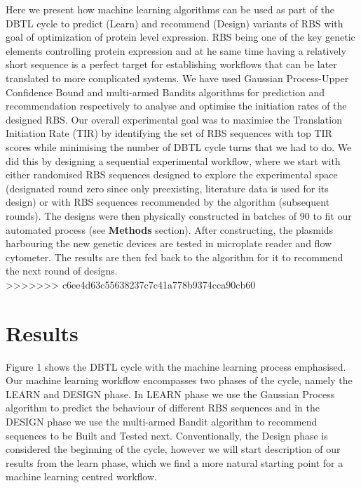 \documentclass{article}
\begin{document}
Here we present how machine learning algorithms can be used as part of the DBTL cycle to predict (Learn) and recommend (Design) variants of RBS with goal of optimization of protein level expression. RBS being one of the key genetic elements controlling protein expression and at he same time having a relatively short sequence is a perfect target for establishing workflows that can be later translated to more complicated systems.
We have used Gaussian Process-Upper Confidence Bound and multi-armed Bandits algorithms for prediction and recommendation respectively to analyse and optimise the initiation rates of the designed RBS. 
Our overall experimental goal was to maximise the Translation Initiation Rate (TIR) by identifying the set of RBS sequences with top TIR scores while minimising the number of DBTL cycle turns that we had to do.
We did this by designing a sequential experimental workflow, where we start with either randomised RBS sequences designed to explore the experimental space (designated round zero since only preexisting, literature data is used for its design) or with RBS sequences recommended by the algorithm (subsequent rounds). The designs were then physically constructed in batches of 90 to fit our automated process (see \textbf{Methods} section).
After constructing, the plasmids harbouring the new genetic devices are tested in microplate reader and flow cytometer. The results are then fed back to the algorithm for it to recommend the next round of designs.\\
>>>>>>> c6ee4d63c55638237c7c41a778b9374cca90cb60



\section{Results}

Figure 1 shows the DBTL cycle with the machine learning process emphasised. Our machine learning workflow encompasses two phases of the cycle, namely the LEARN and DESIGN phase. In LEARN phase we use the Gaussian Process algorithm to predict the behaviour of different RBS sequences and in the DESIGN phase we use the multi-armed Bandit algorithm to recommend sequences to be Built and Tested next. Conventionally, the Design phase is considered the beginning of the cycle, however we will start description of our results from the learn phase, which we find a more natural starting point for a machine learning centred workflow.\\
\end{document}
